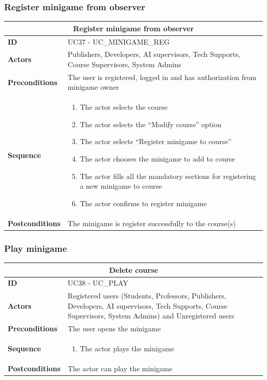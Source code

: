 \subsubsection{Register minigame from observer}
\begin{tabular}{|m{2.5cm}|m{8cm}|}
	\hline
	\multicolumn{2}{|c|}{Register minigame from observer} \\
	\hline
	\textbf{ID} & UC37 - UC\_MINIGAME\_REG \\
	\hline
	\textbf{Actors} & Publishers, Developers, AI supervisors, Tech Supports, Course Supervisors, System Admins \\
	\hline
	\textbf{Preconditions} & The user is registered, logged in and has authorization from minigame owner \\
	\hline
	\textbf{Sequence} & 
	\begin{enumerate}
		\item The actor selects the course
		\item The actor selects the “Modify course” option
		\item The actor selects “Register minigame to course”
		\item The actor chooses the minigame to add to course
		\item The actor fills all the mandatory sections for registering a new minigame to course
		\item The actor confirms to register minigame
	\end{enumerate} \\
	\hline
	\textbf{Postconditions} & The minigame is register successfully to the course(s) \\
	\hline
\end{tabular}

\subsubsection{Play minigame}
\begin{tabular}{|m{2.5cm}|m{8cm}|}
	\hline
	\multicolumn{2}{|c|}{Delete course} \\
	\hline
	\textbf{ID} & UC38 - UC\_PLAY \\
	\hline
	\textbf{Actors} & Registered users (Students, Professors, Publishers, Developers, AI supervisors, Tech Supports, Course Supervisors, System Admins) and Unregistered users \\
	\hline
	\textbf{Preconditions} & The user opens the minigame \\
	\hline
	\textbf{Sequence} & 
	\begin{enumerate}
		\item The actor plays the minigame
	\end{enumerate} \\
	\hline
	\textbf{Postconditions} & The actor can play the minigame \\
	\hline
\end{tabular}

